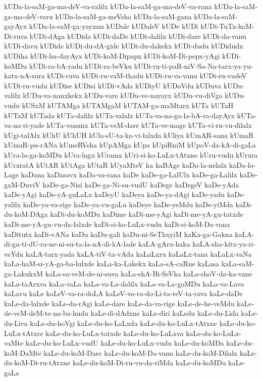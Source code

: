 {kUDa-la-saM-ga-ma-deV-va-ralilx
kUDa-la-saM-ga-ma-deV-va-rana
kUDa-la-saM-ga-ma-deV-varu
kUDa-la-saM-ga-meVsha
kUDa-la-saM-gana
kUDa-la-saM-gayAyx
kUDa-la-saM-ga-yayxnu
kUDale
kUDaleV
kUDe
kUDi
kUDi-TuTx-koM-Di-ruva
kUDi-dAga
kUDida
kUDi-daDe
kUDi-dalilx
kUDi-dare
kUDi-da-vanu
kUDi-davu
kUDide
kUDi-du-dA-gide
kUDi-du-dakekx
kUDi-dudu
kUDidudx
kUDiha
kUDi-hu-dayAyx
kUDi-koM-Dipapx
kUDi-koM-Di-pepx-yAgi
kUDi-koMDu
kUDi-ra-bA-radu
kUDi-ra-beVku
kUDi-ru-ti-paR-niV-Sa-Na-tarx-ya-yu-katx-nA-sura
kUDi-ruva
kUDi-ru-vaM-thadu
kUDi-ru-va-vanu
kUDi-ru-vudeV
kUDi-ru-vudu
kUDise
kUDisi
kUDi-vAda
kUDiyU
kUDoVdu
kUDuva
kUDu-valilx
kUDu-va-nanxkekx
kUDu-vare
kUDu-ve-nayayx
kUDu-vu-diVga
kUDu-vudu
kUSxM
kUTAMga
kUTAMgaM
kUTAM-ga-maMtarx
kUTa
kUTaH
kUTaM
kUTada
kUTa-dalilx
kUTa-valalx
kUTa-va-na-ga-la-bA-ra-dayAyx
kUTa-va-na-ri-yade
kUTa-vanunx
kUTa-veM-dare
kUTa-ve-mage
kUTa-vi-ru-vu-dilalx
kUgi-talAlx
kUhU
kUhUH
kUla-sU-ta-ka-vi-lalxda
kUliya
kUmAR-sana
kUmaR
kUmaR-pu-rANa
kUmeRVsha
kUpAMga
kUpa
kUpiRniM
kUpoV-da-kA-di-gaLa
kUra-la-ga-koMDu
kUra-lagu
kUramx
kUri-si-ko-LuLx-tAtxne
kUru-vudu
kUrxra
kUrxratA
kUtAR
kUtAga
kUtaR
kUyaMteV
ka
kaBAge
kaDa-la-nelalx
kaDa-lo-Lage
kaDana
kaDasavx
kaDa-va-rana
kaDe
kaDe-ga-LalUlx
kaDe-ga-Lalilx
kaDe-gaM-DuviV
kaDe-ga-Nisi
kaDe-ga-Ni-su-vudU
kaDege
kaDegeV
kaDe-yAda
kaDe-yAgi
kaDe-yA-guLaLx
kaDeyU
kaDeya
kaDe-ya-dAgi
kaDe-yadu
kaDe-yalilx
kaDe-ya-va-rige
kaDe-ya-vu-gaLu
kaDeye
kaDe-yeMdu
kaDe-yiMda
kaDi-du-koM-DAga
kaDi-du-koMDu
kaDime
kaDi-me-yAgi
kaDi-me-yA-gu-tatxde
kaDi-me-yA-gu-vu-da-lalxde
kaDi-si-ko-LuLx-vudu
kaDi-si-koM-Da-vana
kaDitutx
kaDi-vANa
kaDu
kaDu-gali
kaDu-ni-SeThxyiM
kaKa-ga-Gakna
kaLA-di-ga-ti-dU-ra-ne-ni-su-ta-la-nA-di-kA-lade
kaLA-gArx-haka
kaLA-sha-kitx-ya-ri-veYdu
kaLA-tarx-yada
kaLA-tiV-ta-vAda
kaLaLxru
kaLaLx-tana
kaLaLx-vaNa
kaLa-haM-si-yA-ga-ba-lulxde
kaLa-ka-Lakekx
kaLa-sA-caRne
kaLasa
kaLa-saM-ga-LakukxM
kaLa-sa-veM-de-ni-suva
kaLa-shA-Bi-SeVka
kaLa-shoV-da-ka-vane
kaLa-taArxva
kaLa-vaLa
kaLa-va-La-dalilx
kaLa-va-La-goMDu
kaLa-va-Lava
kaLavu
kaLe
kaLeV-va-ra-doLA
kaLeV-va-ra-do-Li-ta-reV-ta-rava
kaLe-daDe
kaLe-da-lalxde
kaLe-da-rAgi
kaLe-dare
kaLe-da-va-rige
kaLe-de-he-veMdu
kaLe-de-veM-deM-te-na-ba-hudu
kaLe-di-dAdxne
kaLe-diri
kaLedu
kaLe-du-Lida
kaLe-du-Liva
kaLe-du-hoVgi
kaLe-du-ko-LaLxda
kaLe-du-ko-LuLx-tAtxne
kaLe-du-ko-LuLx-tAtxre
kaLe-du-ko-LuLx-tatxde
kaLe-du-ko-LuLxva
kaLe-du-ko-LuLx-vaMte
kaLe-du-ko-LuLx-vudU
kaLe-du-ko-LuLx-vudu
kaLe-du-koMDa
kaLe-du-koM-DaMte
kaLe-du-koM-Dare
kaLe-du-koM-Da-vanu
kaLe-du-koM-Dilalx
kaLe-du-koM-Di-ru-tAtxne
kaLe-du-koM-Di-ru-vu-da-riMda
kaLe-du-koMDu
kaLe-gaLa
}
